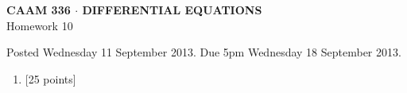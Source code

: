 \documentclass[10pt]{article}
\begin{document}
\vspace*{-5em}
\begin{center}
\large \textsf{\textbf{CAAM 336 $\cdot$ DIFFERENTIAL EQUATIONS}\\[0.5em]
Homework 10 }
\end{center}

Posted Wednesday 11 September 2013.  Due 5pm Wednesday 18 September 2013.

\begin{enumerate}\addtocounter{enumi}{9}
\item {[25 points]}\\  

\end{enumerate}
\end{document}
